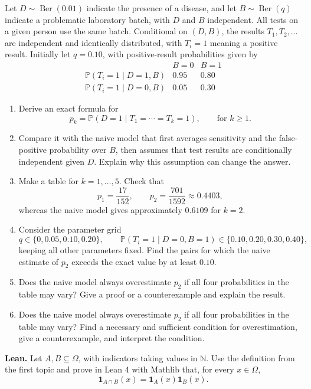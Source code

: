\documentclass[11pt,a4paper]{article}
\newenvironment{enumeratea}{\begin{enumerate}[label=(\alph*),itemsep=0.28em,topsep=0.25em]}{\end{enumerate}}
\newcommand{\Pbb}{\mathbb P}
\newcommand{\Ber}{\operatorname{Ber}}
\newcommand{\ind}{\mathbf 1}
\newcounter{problem}[section]
\begin{document}
\begin{researchtask}
Let $D\sim\Ber(0.01)$ indicate the presence of a disease, and let $B\sim\Ber(q)$
indicate a problematic laboratory batch, with $D$ and $B$ independent. All tests
on a given person use the same batch. Conditional on $(D,B)$, the results
$T_1,T_2,\dots$ are independent and identically distributed, with $T_i=1$ meaning a positive result.
Initially let $q=0.10$, with positive-result probabilities given by
\[
\begin{array}{c|cc}
 & B=0 & B=1\\ \hline
\Pbb(T_i=1\mid D=1,B) & 0.95 & 0.80\\
\Pbb(T_i=1\mid D=0,B) & 0.05 & 0.30
\end{array}
\]
\begin{enumeratea}
  \item Derive an exact formula for
  \[ p_k=\Pbb(D=1\mid T_1=\cdots=T_k=1),\qquad\text{for }k\ge1. \]
  \item Compare it with the naive model that first averages sensitivity and the
  false-positive probability over $B$, then assumes that test results are
  conditionally independent given $D$. Explain why this assumption can change the answer.
  \item Make a table for $k=1,\dots,5$. Check that
  \[ p_1=\frac{17}{152},\qquad p_2=\frac{701}{1592}\approx0.4403, \]
  whereas the naive model gives approximately $0.6109$ for $k=2$.
  \item Consider the parameter grid
  \[
  q\in\{0,0.05,0.10,0.20\},\qquad
  \Pbb(T_i=1\mid D=0,B=1)\in\{0.10,0.20,0.30,0.40\},
  \]
  keeping all other parameters fixed. Find the pairs for which the naive estimate
  of $p_2$ exceeds the exact value by at least $0.10$.
  \item Does the naive model always overestimate $p_2$ if all four probabilities
  in the table may vary? Give a proof or a counterexample and explain the result.
  \item Does the naive model always overestimate $p_2$ if all four probabilities
  in the table may vary? Find a necessary and sufficient condition for overestimation,
  give a counterexample, and interpret the condition.
\end{enumeratea}
\end{researchtask}
\noindent\textbf{Lean.} Let $A,B\subseteq\Omega$, with indicators taking values
in $\mathbb N$. Use the definition from the first topic and prove in Lean 4 with
Mathlib that, for every $x\in\Omega$,
\[ \ind_{A\cap B}(x)=\ind_A(x)\ind_B(x). \]
\end{document}
